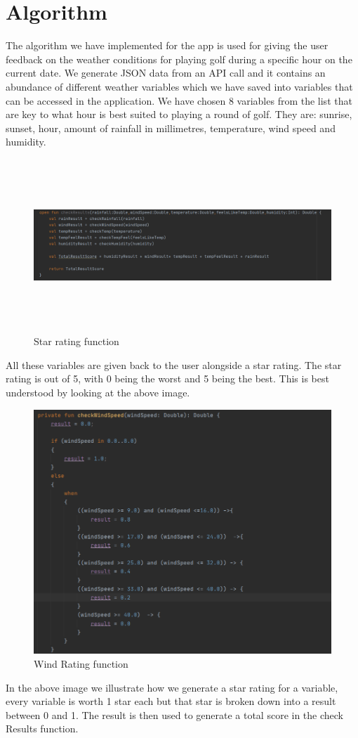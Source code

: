 \section{Algorithm}
The algorithm we have implemented for the app is used for giving the user feedback on the weather conditions for playing golf during a specific hour on the current date. We generate JSON data from an API call and it contains an abundance of different weather variables which we have saved into variables that can be accessed in the application. We have chosen 8 variables from the list that are key to what hour is best suited to playing a round of golf. They are: sunrise, sunset, hour, amount of rainfall in millimetres, temperature, wind speed and humidity.
\begin{figure}[H]
    \centering
    \includegraphics[width=13cm,height =6.5cm]{img/starRating.PNG}
    \caption{Star rating function}
    \label{fig:altas config}
\end{figure}
All these variables are given back to the user alongside a star rating. The star rating is out of 5, with 0 being the worst and 5 being the best. This is best understood by looking at the above image.


\begin{figure}[H]
    \centering
    \includegraphics[width=12cm]{img/starEx.PNG}
    \caption{Wind Rating function}
    \label{fig:altas config}
\end{figure}
In the above image we illustrate how we generate a star rating for a variable, every variable is worth 1 star each but that star is broken down into a result between 0 and 1. The result is then used to generate a total score in the check Results function.
